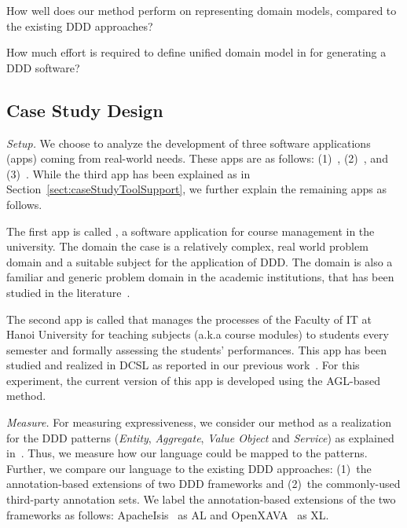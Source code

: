 \begin{description}[labelindent=0.5cm,leftmargin=0.5cm]
%
\item[\textbf{RQ1.}] How well does our method perform on representing domain models, compared to the existing DDD approaches?
%
\item[\textbf{RQ2.}] How much effort is required to define unified domain model in \agldcsl for generating a DDD software?
%
%
\end{description}
 
\subsection{Case Study Design}
\label{subsect:caseDesign} 

\noindent \textit{Setup.} We choose to analyze the development of three software applications (apps) coming from real-world needs. These apps are as follows: (1)~\courseman, (2)~\processman, and (3)~\orderman. While the third app has been explained as in Section~\ref{sect:caseStudyToolSupport}, we further explain the remaining apps as follows.	

The first app is called \courseman, a software application for course management in the university. The domain \wrt the case is a relatively complex, real world problem domain and a suitable subject for the application of DDD. The domain is also a familiar and generic problem domain in the academic institutions, that has been studied in the literature~\cite{ajanovskiIntegrationCourseEnrolment2013,omahonyRecommenderSystemOnline2007,le_domain_2018}.

The second app is called \processman that manages the processes of the Faculty of IT at Hanoi University for teaching subjects (a.k.a course modules) to students every semester and formally assessing the students’ performances. This app has been studied and realized in DCSL as reported in our previous work~\cite{le_generative_2018}. For this experiment, the current version of this app is developed using the AGL-based method.

\vspace{0.1cm}
\noindent\textit{Measure.} For measuring expressiveness, we consider our method as a realization for the DDD patterns (\textit{Entity}, \textit{Aggregate}, \textit{Value Object} and \textit{Service}) as explained in~\cite{evans_domain-driven_2004}. Thus, we measure how our language could be mapped to the patterns. Further, we compare our language to the existing DDD approaches: (1)~the annotation-based extensions of two DDD frameworks and (2)~the commonly-used third-party annotation sets. We label the annotation-based extensions of the two frameworks as follows: ApacheIsis~\cite{apache-s.f_apache_2016} as AL and OpenXAVA~\cite{noauthor_openxava_2016} as XL. 

